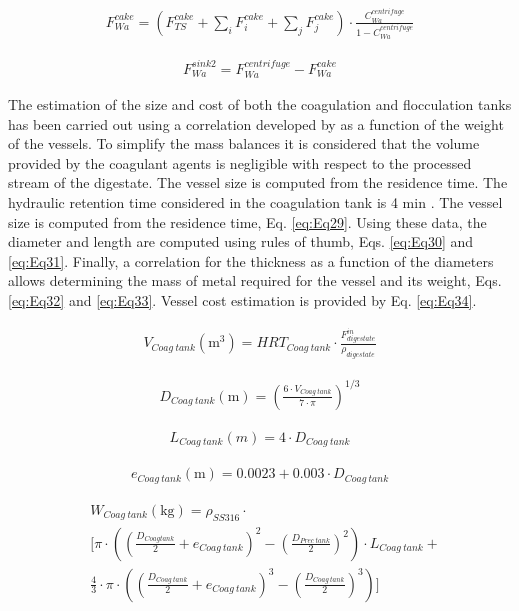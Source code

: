 \begin{refsection}[referencesCh2]
\begin{align}
	{F}_{Wa}^{cake} = \left( {F}_{TS}^{cake} + \sum\limits_i {F_i^{cake} + \sum\limits_j {F}_j^{cake}}  \right) \cdot \frac{{C_{Wa}^{centrifuge}}}{{1 - C_{Wa}^{centrifuge}}} \label{eq:Eq27}
\end{align}

\begin{align}
	{F}_{Wa}^{sink2} = F_{Wa}^{centrifuge} - F_{Wa}^{cake} \label{eq:Eq28}
\end{align}

The estimation of the size and cost of both the coagulation and flocculation tanks has been carried out using a correlation developed by \citet{almena2016technoeconomic} as a function of the weight of the vessels. To simplify the mass balances it is considered that the volume provided by the coagulant agents is negligible with respect to the processed stream of the digestate. The vessel size is computed from the residence time. The hydraulic retention time considered in the coagulation tank is 4 min \citep{zhou2008enhanced}. The vessel size is computed from the residence time, Eq. \ref{eq:Eq29}. Using these data, the diameter and length are computed using rules of thumb, Eqs. \ref{eq:Eq30} and \ref{eq:Eq31}. Finally, a correlation for the thickness as a function of the diameters allows determining the mass of metal required for the vessel and its weight, Eqs. \ref{eq:Eq32} and \ref{eq:Eq33}. Vessel cost estimation is provided by Eq. \ref{eq:Eq34}.

\begin{align}
	{V}_{Coag \ tank}\left( \text{m}^{3} \right) = HR{T_{Coag \ tank}} \cdot \frac{F_{digestate}^{in}}{\rho_{digestate}} \label{eq:Eq29}
\end{align}

\begin{align}
	{D_{Coag \ tank}} \left( \text{m} \right) = \left( \frac{6 \cdot{V}_{Coag \ tank}}{7 \cdot \pi} \right)^{1/3} \label{eq:Eq30}
\end{align}

\begin{align}
	{L_{{{Coag \ tank}}}}\left( m \right) = 4\cdot{D_{Coag \ tank}} \label{eq:Eq31}
\end{align}

\begin{align}
	{e_{Coag \ tank}}\left( \text{m} \right) = 0.0023 + 0.003\cdot{D_{{{Coag \ tank}}}} \label{eq:Eq32}
\end{align}

\begin{align}
	& {W_{Coag \ tank}}\left( \text{kg} \right) = {\rho_{SS316}}\cdot \label{eq:Eq33} \\
	& \Bigg[ \pi \cdot \left( {{{\left( \frac{{{D_{Coag tank}}}}{2} + {e_{Coag \ tank}} \right)}^2} - {{\left( \frac{{{D_{Prec \ tank}}}}{2} \right)}^2}} \right)\cdot{L_{Coag \ tank}} + \nonumber \\ 
	& \frac{4}{3} \cdot \pi \cdot \left( \left( \frac{D_{Coag \ tank}}{2} + {e_{Coag \ tank}} \right)^3 - \left( \frac{D_{Coag \ tank}}{2} \right)^3 \right) \Bigg] \nonumber
\end{align}


\end{refsection}
